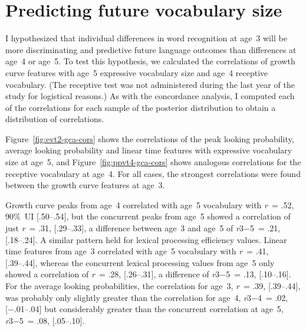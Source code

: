\documentclass [11pt, proquest] {uwthesis}[2015/03/03]
\begin{document}
\section{Predicting future vocabulary
size}\label{predicting-future-vocabulary-size}

I hypothesized that individual differences in word recognition at age~3
will be more discriminating and predictive future language outcomes than
differences at age~4 or age~5. To test this hypothesis, we calculated
the correlations of growth curve features with age~5 expressive
vocabulary size and age~4 receptive vocabulary. (The receptive test was
not administered during the last year of the study for logistical
reasons.) As with the concordance analysis, I computed each of the
correlations for each sample of the posterior distribution to obtain a
distribution of correlations.

Figure~\ref{fig:evt2-gca-cors} shows the correlations of the peak
looking probability, average looking probability and linear time
features with expressive vocabulary size at age~5, and
Figure~\ref{fig:ppvt4-gca-cors} shows analogous correlations for the
receptive vocabulary at age~4. For all cases, the strongest correlations
were found between the growth curve features at age~3.

Growth curve peaks from age~4 correlated with age~5 vocabulary with
\emph{r}~= .52, 90\%~UI {[}.50--.54{]}, but the concurrent peaks from
age~5 showed a correlation of just \emph{r}~= .31, {[}.29--.33{]}, a
difference between age~3 and age~5 of \emph{r}3−5~= .21, {[}.18--.24{]}.
A similar pattern held for lexical processing efficiency values. Linear
time features from age~3 correlated with age~5 vocabulary with
\emph{r}~= .41, {[}.39--.44{]}, whereas the concurrent lexical
processing values from age~5 only showed a correlation of \emph{r}~=
.28, {[}.26--.31{]}, a difference of \emph{r}3−5~= .13, {[}.10--.16{]}.
For the average looking probabilities, the correlation for age~3,
\emph{r}~= .39, {[}.39--.44{]}, was probably only slightly greater than
the correlation for age~4, \emph{r}3−4~= .02, {[}−.01--.04{]} but
considerably greater than the concurrent correlation at age~5,
\emph{r}3−5~= .08, {[}.05--.10{]}.
\end{document}
